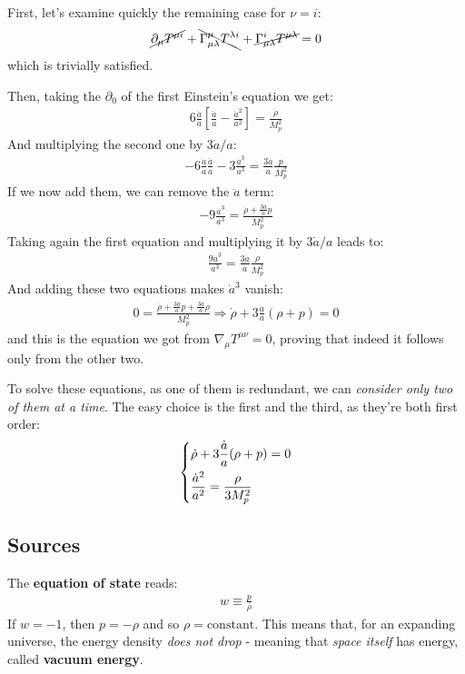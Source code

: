\documentclass[../template.tex]{subfiles}
\begin{document}
First, let's examine quickly the remaining case for $\nu = i$:
\begin{align*}
    \cancel{\partial_\mu T^{\mu i}} + \bcancel{\Gamma^{\mu}_{\mu \lambda} T^{\lambda i} }+ \cancel{\Gamma^{i}_{\mu \lambda} T^{\mu \lambda} }= 0
\end{align*} 
which is trivially satisfied.

Then, taking the $\partial_0$ of the first Einstein's equation we get:
\begin{align*}
    6 \frac{\dot{a}}{a} \left[\frac{\ddot{a}}{a} - \frac{\dot{a}^2}{a^2}  \right] = \frac{\dot{\rho}}{M_p^2} 
\end{align*} 
And multiplying the second one by $3\dot{a}/a$:
\begin{align*}
    -6 \frac{\dot{a}}{a} \frac{\ddot{a}}{a} - 3 \frac{\dot{a}^3}{a^3} = \frac{3 \dot{a}}{a} \frac{p}{M_p^2}     
\end{align*} 
If we now add them, we can remove the $\ddot{a}$ term:
\begin{align*}
    -9 \frac{\dot{a}^3}{a^3} = \frac{\dot{\rho} + \frac{3 \dot{a}}{a} p }{M_p^2}  
\end{align*} 
Taking again the first equation and multiplying it by $3 \dot{a}/a$ leads to:
\begin{align*}
    \frac{9\dot{a}^3}{a^3} = \frac{3 \dot{a}}{a} \frac{\rho}{M_p^2}   
\end{align*} 
And adding these two equations makes $\dot{a}^3$ vanish:
\begin{align*}
    0 = \frac{\dot{\rho} + \frac{3 \dot{a}}{a} p + \frac{3 \dot{a}}{a} \rho  }{M_p^2} \Rightarrow \dot{\rho} + 3\frac{\dot{a}}{a} (\rho + p)  = 0
\end{align*} 
and this is the equation we got from $\nabla_\mu T^{\mu \nu} = 0$, proving that indeed it follows only from the other two.

To solve these equations, as one of them is redundant, we can \textit{consider only two of them at a time}. The easy choice is the first and the third, as they're both first order:
\begin{align*}
    \begin{dcases}
        \dot{\rho} + 3\frac{\dot{a}}{a} (\rho + p) = 0      \\
        \frac{\dot{a}^2}{a^2} = \frac{\rho}{3 M_p^2}   
    \end{dcases}
\end{align*} 

\subsection{Sources}
The \textbf{equation of state} reads:
\begin{align*}
    w \equiv \frac{p}{\rho} 
\end{align*} 
If $w = -1$, then $p = -\rho$ and so $\rho = \mathrm{constant}$. This means that, for an expanding universe, the energy density \textit{does not drop} - meaning that \textit{space itself} has energy, called \textbf{vacuum energy}.
\end{document}
